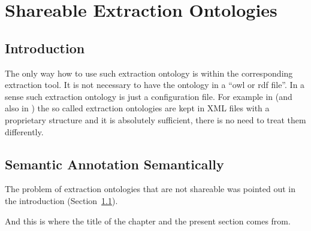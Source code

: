 \chapter{Shareable Extraction Ontologies} \label{ch:Shareable_Extraction_Ontologies}

\graphicspath{{../img/ch70/}}



\section{Introduction} \label{sec:ch70_intro}

The only way how to use such extraction ontology is within the corresponding extraction tool. It is not necessary to have the ontology in a ``owl or rdf file''. In a sense such extraction ontology is just a configuration file. For example in \citep{springerlink:10.1007/978-3-642-01891-6_5} %
 (and also in \citep{DBLP:conf/er/EmbleyTL02}) the so called extraction ontologies are kept in XML files with a proprietary structure and it is absolutely sufficient, there is no need to treat them differently.









\section{Semantic Annotation Semantically} \label{sec:main}

The problem of extraction ontologies that are not shareable was pointed out in the introduction (Section~\ref{sec:ch70_intro}). 

And this is where the title of the chapter and the present section comes from. 










